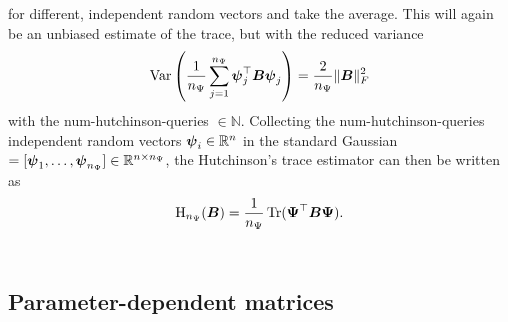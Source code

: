 for different, independent random vectors and take the average. This will again
be an unbiased estimate of the trace, but with the reduced variance
\begin{equation}
    \operatorname{Var}\left( \frac{1}{n_{\Psi}} \sum_{j=1}^{n_{\Psi}}\boldsymbol{\psi}_j^{\top} \boldsymbol{B} \boldsymbol{\psi}_j\right) = \frac{2}{n_{\Psi}} \lVert \boldsymbol{B} \rVert _F^2
    \label{equ:2-chebyshev-hutchinson-mse}
\end{equation}
with the \gls{num-hutchinson-queries} $\in \mathbb{N}$.
Collecting the \gls{num-hutchinson-queries} independent random vectors
$\boldsymbol{\psi}_i \in \mathbb{R}^{n}$ in the standard Gaussian
 $= [\boldsymbol{\psi}_1, \dots, \boldsymbol{\psi}_{n_{\Psi}}] \in \mathbb{R}^{n \times n_{\Psi}}$,
the Hutchinson's trace estimator can then be written as
\begin{equation}
    \operatorname{H}_{n_{\Psi}}(\boldsymbol{B}) = \frac{1}{n_{\Psi}} \operatorname{Tr}(\boldsymbol{\Psi}^{\top} \boldsymbol{B} \boldsymbol{\Psi}).
    \label{equ:2-chebyshev-DGC-hutchionson-estimator}
\end{equation}\\

\subsection{Parameter-dependent matrices}
\label{subsec:2-chebyshev-trace-parametrized}

